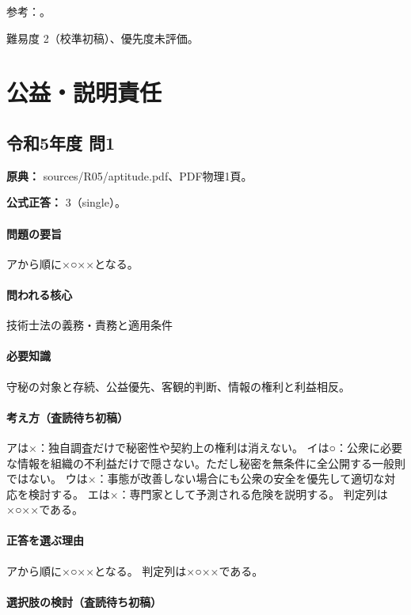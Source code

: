 \par 参考：\cite{engineer_act_current}。

\par 難易度 2（校準初稿）、優先度未評価。

\section{公益・説明責任}

\subsection{令和5年度 問1}
\label{q:r05-reg-apt-01}

\noindent\textbf{原典：} sources/R05/aptitude.pdf、PDF物理1頁。

\textbf{公式正答：} 3（single）。

\paragraph{問題の要旨} アから順に×○××となる。

\paragraph{問われる核心} 技術士法の義務・責務と適用条件

\paragraph{必要知識} 守秘の対象と存続、公益優先、客観的判断、情報の権利と利益相反。

\paragraph{考え方（査読待ち初稿）} アは×：独自調査だけで秘密性や契約上の権利は消えない。 イは○：公衆に必要な情報を組織の不利益だけで隠さない。ただし秘密を無条件に全公開する一般則ではない。 ウは×：事態が改善しない場合にも公衆の安全を優先して適切な対応を検討する。 エは×：専門家として予測される危険を説明する。 判定列は×○××である。

\paragraph{正答を選ぶ理由} アから順に×○××となる。  判定列は×○××である。

\paragraph{選択肢の検討（査読待ち初稿）}\mbox{}\par

